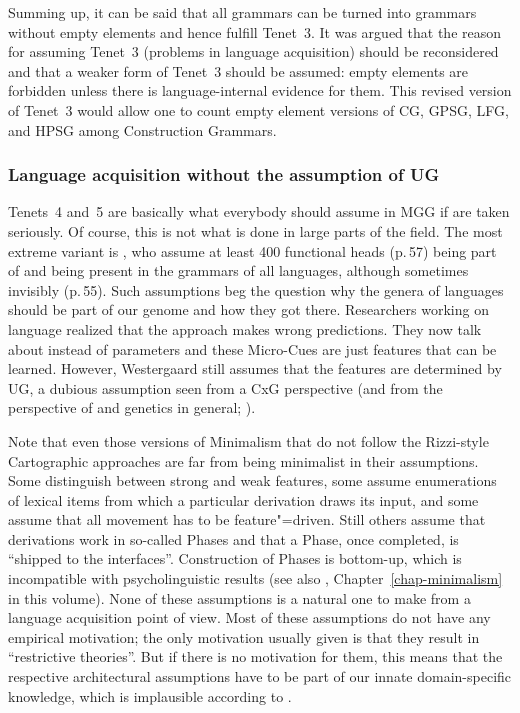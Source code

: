 \documentclass[output=paper,biblatex,babelshorthands,newtxmath,draftmode,colorlinks,citecolor=brown]{langscibook}
\begin{document}
Summing up, it can be said that all grammars can be turned into grammars without empty elements and
hence fulfill Tenet~3. It was argued that the reason for assuming Tenet~3 (problems in language
acquisition) should be reconsidered and that a weaker form of Tenet~3 should be assumed: empty
elements are forbidden unless there is language-internal evidence for them. This revised version of
Tenet~3 would allow one to count empty element versions of CG, GPSG, LFG, and HPSG among Construction Grammars.



\subsubsection{Language acquisition without the assumption of UG}

Tenets~4 and~5 are basically what everybody should assume in MGG if \citet*{HCF2002a} are taken seriously. Of
course, this is not what is done in large parts of the field. The most extreme variant is
\citet{CR2010a}, who assume at least 400 functional heads (p.\,57) being part of  and being present in the grammars of all languages, although sometimes
invisibly (p.\,55). Such assumptions beg the question why the genera of  languages should be part of our
genome and how they got there.
Researchers working on language  realized that the 
approach \citep{Meisel95a} makes wrong predictions. They now talk about  instead of
parameters \citep{Westergaard2014a} and these Micro-Cues are just features that can be
learned. However, Westergaard still assumes that the features are determined by UG, a dubious
assumption seen from a CxG perspective (and from the perspective of \citeauthor*{HCF2002a} and
genetics in general; \citealt{Bishop2002a}).

Note that even those versions of Minimalism that do not follow the Rizzi-style Cartographic
approaches are far from being minimalist in their assumptions. Some distinguish between strong
and weak features, some assume enumerations of lexical items from which a particular derivation
draws its input, and some assume that all movement has to be feature"=driven. Still others assume that
derivations work in so-called Phases and that a Phase, once completed, is ``shipped to the
interfaces''. Construction of Phases is bottom-up, which is incompatible with psycholinguistic
results (see also \citealt[Section~\ref{sec-minimalism-processing}]{chapters/minimalism}, Chapter~\ref{chap-minimalism} in this
volume). None of these assumptions is a natural one to make from a
language acquisition point of view. Most of these assumptions do not have any empirical motivation; the
only motivation usually given is that they result in ``restrictive theories''. But if there is no
motivation for them, this means that the respective architectural assumptions have to be part of our
innate domain-specific knowledge, which is implausible according to \citet*{HCF2002a}.
\end{document}
